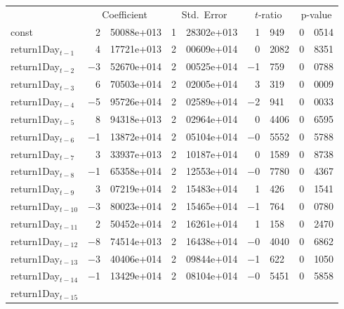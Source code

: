 \begin{center}
\begin{tabular}{lr@{.}lr@{.}lr@{.}lr@{.}l}
    &
    \multicolumn{2}{c}{Coefficient} &
    \multicolumn{2}{c}{Std.\ Error} &
    \multicolumn{2}{c}{$t$-ratio} &
    \multicolumn{2}{c}{p-value} \\[1ex]
const &
    2&50088\textrm{e+013} &
    1&28302\textrm{e+013} &
        1&949 &
        0&0514 \\
return1Day$_{t-1}$ &
    4&17721\textrm{e+013} &
    2&00609\textrm{e+014} &
        0&2082 &
        0&8351 \\
return1Day$_{t-2}$ &
    $-$3&52670\textrm{e+014} &
    2&00525\textrm{e+014} &
        $-$1&759 &
        0&0788 \\
return1Day$_{t-3}$ &
    6&70503\textrm{e+014} &
    2&02005\textrm{e+014} &
        3&319 &
        0&0009 \\
return1Day$_{t-4}$ &
    $-$5&95726\textrm{e+014} &
    2&02589\textrm{e+014} &
        $-$2&941 &
        0&0033 \\
return1Day$_{t-5}$ &
    8&94318\textrm{e+013} &
    2&02964\textrm{e+014} &
        0&4406 &
        0&6595 \\
return1Day$_{t-6}$ &
    $-$1&13872\textrm{e+014} &
    2&05104\textrm{e+014} &
        $-$0&5552 &
        0&5788 \\
return1Day$_{t-7}$ &
    3&33937\textrm{e+013} &
    2&10187\textrm{e+014} &
        0&1589 &
        0&8738 \\
return1Day$_{t-8}$ &
    $-$1&65358\textrm{e+014} &
    2&12553\textrm{e+014} &
        $-$0&7780 &
        0&4367 \\
return1Day$_{t-9}$ &
    3&07219\textrm{e+014} &
    2&15483\textrm{e+014} &
        1&426 &
        0&1541 \\
return1Day$_{t-10}$ &
    $-$3&80023\textrm{e+014} &
    2&15465\textrm{e+014} &
        $-$1&764 &
        0&0780 \\
return1Day$_{t-11}$ &
    2&50452\textrm{e+014} &
    2&16261\textrm{e+014} &
        1&158 &
        0&2470 \\
return1Day$_{t-12}$ &
    $-$8&74514\textrm{e+013} &
    2&16438\textrm{e+014} &
        $-$0&4040 &
        0&6862 \\
return1Day$_{t-13}$ &
    $-$3&40406\textrm{e+014} &
    2&09844\textrm{e+014} &
        $-$1&622 &
        0&1050 \\
return1Day$_{t-14}$ &
    $-$1&13429\textrm{e+014} &
    2&08104\textrm{e+014} &
        $-$0&5451 &
        0&5858 \\
return1Day$_{t-15}$ &

\end{tabular}
\end{center}
